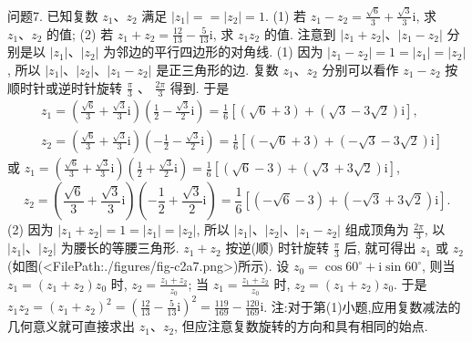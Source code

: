 问题7. 已知复数 $z_1 、 z_2$ 满足 $\left|z_1\right|==\left|z_2\right|=1$.
(1) 若 $z_1-z_2=\frac{\sqrt{6}}{3}+\frac{\sqrt{3}}{3} \mathrm{i}$, 求 $z_1 、 z_2$ 的值;
(2) 若 $z_1+z_2=\frac{12}{13}-\frac{5}{13} \mathrm{i}$, 求 $z_1 z_2$ 的值.
注意到 $\left|z_1+z_2\right| 、\left|z_1-z_2\right|$ 分别是以 $\left|z_1\right| 、\left|z_2\right|$ 为邻边的平行四边形的对角线.
(1) 因为 $\left|z_1-z_2\right|=1=\left|z_1\right|=\left|z_2\right|$, 所以 $\left|z_1\right| 、\left|z_2\right| 、\left|z_1-z_2\right|$ 是正三角形的边.
复数 $z_1 、 z_2$ 分别可以看作 $z_1-z_2$ 按顺时针或逆时针旋转 $\frac{\pi}{3}$ 、 $\frac{2 \pi}{3}$ 得到.
于是
$$
\begin{aligned}
& z_1=\left(\frac{\sqrt{6}}{3}+\frac{\sqrt{3}}{3} \mathrm{i}\right)\left(\frac{1}{2}-\frac{\sqrt{3}}{2} \mathrm{i}\right)=\frac{1}{6}[(\sqrt{6}+3)+(\sqrt{3}-3 \sqrt{2}) \mathrm{i}], \\
& z_2=\left(\frac{\sqrt{6}}{3}+\frac{\sqrt{3}}{3} \mathrm{i}\right)\left(-\frac{1}{2}-\frac{\sqrt{3}}{2} \mathrm{i}\right)=\frac{1}{6}[(-\sqrt{6}+3)+(-\sqrt{3}-3 \sqrt{2}) \mathrm{i}]
\end{aligned}
$$
或 $z_1=\left(\frac{\sqrt{6}}{3}+\frac{\sqrt{3}}{3} \mathrm{i}\right)\left(\frac{1}{2}+\frac{\sqrt{3}}{2} \mathrm{i}\right)=\frac{1}{6}[(\sqrt{6}-3)+(\sqrt{3}+3 \sqrt{2}) \mathrm{i}]$,
$$
z_2=\left(\frac{\sqrt{6}}{3}+\frac{\sqrt{3}}{3} \mathrm{i}\right)\left(-\frac{1}{2}+\frac{\sqrt{3}}{2} \mathrm{i}\right)=\frac{1}{6}[(-\sqrt{6}-3)+(-\sqrt{3}+3 \sqrt{2}) \mathrm{i}] .
$$
(2) 因为 $\left|z_1+z_2\right|=1=\left|z_1\right|=\left|z_2\right|$, 所以 $\left|z_1\right| 、\left|z_2\right| 、\left|z_1-z_2\right|$ 组成顶角为 $\frac{2 \pi}{3}$, 以 $\left|z_1\right| 、\left|z_2\right|$ 为腰长的等腰三角形.
$z_1+z_2$ 按逆(顺) 时针旋转 $\frac{\pi}{3}$ 后, 就可得出 $z_1$ 或 $z_2$ (如图(<FilePath:./figures/fig-c2a7.png>)所示).
设 $z_0=\cos 60^{\circ}+\mathrm{i} \sin 60^{\circ}$, 则当 $z_1=\left(z_1+z_2\right) z_0$ 时, $z_2= \frac{z_1+z_2}{z_0}$; 当 $z_1=\frac{z_1+z_2}{z_0}$ 时, $z_2=\left(z_1+z_2\right) z_0$.
于是 $z_1 z_2=\left(z_1+z_2\right)^2=\left(\frac{12}{13}-\frac{5}{13} \mathrm{i}\right)^2=\frac{119}{169}-\frac{120}{169} \mathrm{i}$.
注:对于第(1)小题,应用复数减法的几何意义就可直接求出 $z_1 、 z_2$, 但应注意复数旋转的方向和具有相同的始点.



